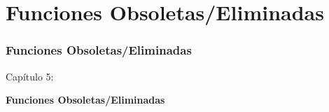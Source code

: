 %

\section{Funciones Obsoletas/Eliminadas}
\begin{frame}[fragile]
	\frametitle{Funciones Obsoletas/Eliminadas}

	\begin{center}\huge{Capítulo 5:}\end{center}
	\begin{center}\huge{\color{typo3darkgrey}\textbf{Funciones Obsoletas/Eliminadas}}\end{center}

\end{frame}


